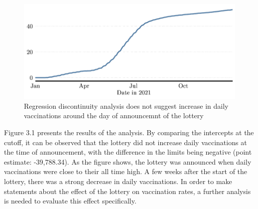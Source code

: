 \documentclass{scrbook}
\begin{document}
\begin{figure}[h]
\caption[Regression discontinuity analysis of daily vaccinations]{Regression discontinuity analysis does not suggest increase in daily vaccinations around the day of announcemnt of the lottery}

\begin{center}\includegraphics{bachelor_thesis_files/figure-latex/unnamed-chunk-2-1} \end{center}
\end{figure}

Figure 3.1 presents the results of the analysis. By comparing the
intercepts at the cutoff, it can be observed that the lottery did not
increase daily vaccinations at the time of announcement, with the
difference in the limits being negative (point estimate: -39,788.34). As
the figure shows, the lottery was announced when daily vaccinations were
close to their all time high. A few weeks after the start of the
lottery, there was a strong decrease in daily vaccinations. In order to
make statements about the effect of the lottery on vaccination rates, a
further analysis is needed to evaluate this effect specifically.
\end{document}
